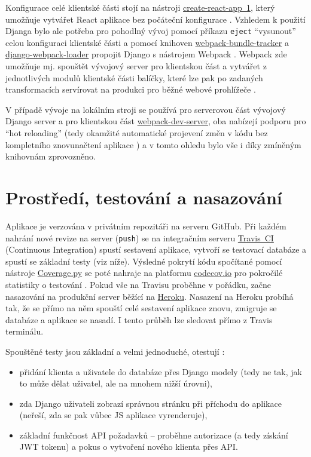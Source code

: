 Konfigurace celé klientské části stojí na nástroji \href{https://github.com/facebook/create-react-app}{create-react-app~1}, který umožňuje vytvářet React aplikace bez počáteční konfigurace \cite{cra}. Vzhledem k použití Djanga bylo ale potřeba pro pohodlný vývoj pomocí příkazu \verb|eject| \enquote{vysunout} celou konfiguraci klientské části a pomocí knihoven \href{https://github.com/owais/webpack-bundle-tracker}{webpack-bundle-tracker} a  \href{https://github.com/owais/django-webpack-loader}{django-webpack-loader} propojit Django s nástrojem Webpack \cite{bp}. Webpack zde umožňuje mj. spouštět vývojový server pro klientskou část a vytvářet z jednotlivých modulů klientské části balíčky, které lze pak po zadaných transformacích servírovat na produkci pro běžné webové prohlížeče \cite{webpack-ackee}.

V případě vývoje na lokálním stroji se používá \cite{bp} pro serverovou část vývojový Django server a pro klientskou část \href{https://github.com/webpack/webpack-dev-server}{webpack-dev-server}, oba nabízejí podporu pro \enquote{hot reloading} (tedy okamžité automatické projevení změn v kódu bez kompletního znovunačtení aplikace \cite{webpack-docs-hmr}) a v tomto ohledu bylo vše i díky zmíněným knihovnám zprovozněno.

\section{Prostředí, testování a nasazování}\label{sec:prostreditestovaninasazovani}

Aplikace \cite{bp} je verzována v privátním repozitáři na serveru GitHub. Při každém nahrání nové revize na server (\verb|push|) se na integračním serveru \href{https://travis-ci.com/}{Travis~CI} (Continuous Integration) spustí sestavení aplikace, vytvoří se testovací databáze a spustí se základní testy (viz níže). Výsledné pokrytí kódu spočítané pomocí nástroje \href{https://coverage.readthedocs.io/}{Coverage.py} se poté nahraje na platformu \href{https://codecov.io/}{codecov.io} pro pokročilé statistiky o testování \cite{codecov}. Pokud vše na Travisu proběhne v pořádku, začne nasazování na produkční server běžící na \href{https://www.heroku.com/}{Heroku}. Nasazení na Heroku probíhá tak, že se přímo na něm spouští celé sestavení aplikace znovu, zmigruje se databáze a aplikace se nasadí. I tento průběh lze sledovat přímo z Travis terminálu.

Spouštěné testy jsou základní a velmi jednoduché, otestují \cite{bp}:
\begin{itemize}
    \item přidání klienta a uživatele do databáze přes Django modely (tedy ne tak, jak to může dělat uživatel, ale na mnohem nižší úrovni),
    \item zda Django uživateli zobrazí správnou stránku při příchodu do aplikace (neřeší, zda se pak vůbec JS aplikace vyrenderuje),
    \item základní funkčnost API požadavků -- proběhne autorizace (a tedy získání JWT tokenu) a pokus o vytvoření nového klienta přes API.
\end{itemize}

